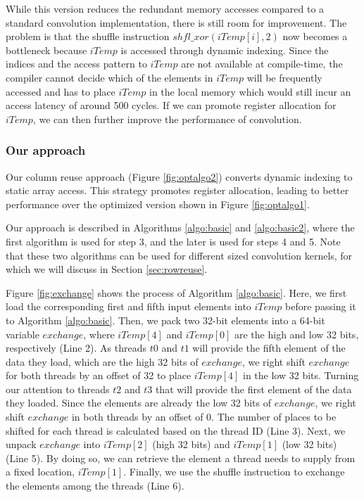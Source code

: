 While this version reduces the redundant memory accesses compared to a standard convolution implementation, there is still room for
improvement. The problem is that the shuffle instruction $shfl\_xor(iTemp[i],2)$ now becomes a bottleneck because $iTemp$ is accessed
through dynamic indexing. Since the indices and the access pattern to $iTemp$ are not available at compile-time, the compiler cannot decide
which of the elements in $iTemp$ will be frequently accessed and has to place $iTemp$ in the local memory which would still incur an access
latency of around 500 cycles. If we can promote register allocation for $iTemp$, we can then further improve the performance of
convolution.


\subsubsection{Our approach}
Our column reuse approach (Figure \ref {fig:optalgo2}) converts dynamic indexing to static array access. This strategy promotes register
allocation, leading to better performance over the optimized version shown in Figure \ref{fig:optalgo1}.

Our approach is described in Algorithms \ref{algo:basic} and \ref{algo:basic2},
where the first algorithm is used for step 3, and the later is used for steps 4 and 5. Note that these two algorithms can be used for
different sized convolution kernels, for which we will discuss in Section \ref {sec:rowreuse}.

Figure \ref{fig:exchange} shows the process of Algorithm \ref{algo:basic}. Here, we first load the corresponding first and fifth input elements
into $iTemp$ before passing it to Algorithm \ref{algo:basic}. Then, we pack two 32-bit elements into a 64-bit variable $exchange$, where
$iTemp[4]$ and $iTemp[0]$ are the high and low 32 bits, respectively (Line 2).  As threads $t0$ and $t1$ will provide the fifth element of
the data they load, which are the high 32 bits of $exchange$, we right shift $exchange$ for both threads by an offset of 32 to place
$iTemp[4]$ in the low 32 bits. Turning our attention to threads $t2$ and $t3$ that will provide the first element of the data they loaded.
Since the elements are already the low 32 bits of $exchange$, we right shift $exchange$ in both threads by an offset of 0. The number of
places to be shifted for each thread is calculated based on the thread ID (Line 3). Next, we unpack $exchange$ into $iTemp[2]$ (high 32
bits) and $iTemp[1]$ (low 32 bits) (Line 5). By doing so, we can retrieve the element a thread needs to supply from a fixed location,
$iTemp[1]$. Finally, we use the shuffle instruction to exchange the elements among the threads (Line 6).



